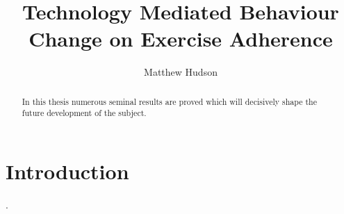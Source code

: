 \documentclass[11pt]{report}
\title{ Technology Mediated Behaviour Change on Exercise Adherence} \author{Matthew Hudson}
\begin{document}
\maketitle
\begin{abstract}
In this thesis numerous seminal results are proved which will decisively shape the future development of the subject. \end{abstract}


\chapter{Introduction}
\label{ch:intro}
\cite{klasnja2011evaluate}.







\end{document}
